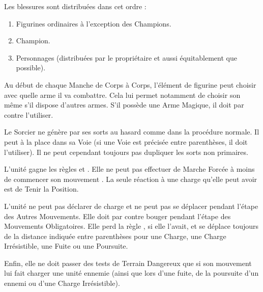 Les blessures sont distribuées dans cet ordre :
\begin{enumerate}
\item Figurines ordinaires à l'exception des Champions.
\item Champion.
\item Personnages (distribuées par le propriétaire et aussi équitablement que possible).
\end{enumerate}


Au début de chaque Manche de Corps à Corps, l'élément de figurine peut choisir avec quelle arme il va combattre. Cela lui permet notamment de choisir son \hw{} même s'il dispose d'autres armes. S'il possède une Arme Magique, il doit par contre l'utiliser.


Le Sorcier ne génère par ses sorts au hasard comme dans la procédure normale. Il peut à la place  dans sa Voie (si une Voie est précisée entre parenthèses, il doit l'utiliser). Il ne peut cependant toujours pas dupliquer les sorts non primaires.


L'unité gagne les règles \immunetopsychology{} et \unstable{}. Elle ne peut pas effectuer de Marche Forcée à moins de commencer son mouvement . La seule réaction à une charge qu'elle peut avoir est de Tenir la Position.

\newpage
{}

L'unité ne peut pas déclarer de charge et ne peut pas se déplacer pendant l'étape des Autres Mouvements. Elle doit par contre bouger pendant l'étape des Mouvements Obligatoires. Elle perd la règle \swiftstride{}, si elle l'avait, et se déplace toujours de la distance indiquée entre parenthèses pour une Charge, une Charge Irrésistible, une Fuite ou une Poursuite.

 Enfin, elle ne doit passer des tests de Terrain Dangereux que si son mouvement lui fait charger une unité ennemie (ainsi que lors d'une fuite, de la poursuite d'un ennemi ou d'une Charge Irrésistible).

